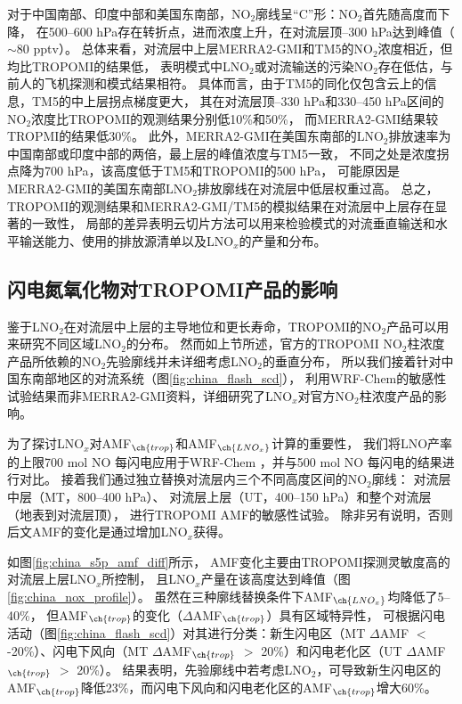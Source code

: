 对于中国南部、印度中部和美国东南部，NO$_2$廓线呈“C”形：NO$_2$首先随高度而下降，
在500--600 hPa存在转折点，进而浓度上升，在对流层顶--300 hPa达到峰值（$\sim$80 pptv）。
总体来看，对流层中上层MERRA2-GMI和TM5的NO$_2$浓度相近，但均比TROPOMI的结果低，
表明模式中LNO$_2$或对流输送的污染NO$_2$存在低估，与前人的飞机探测和模式结果相符\citep{Laughner.2019a}。
具体而言，由于TM5的同化仅包含云上的信息，TM5的中上层拐点梯度更大，
其在对流层顶--330 hPa和330--450 hPa区间的NO$_2$浓度比TROPOMI的观测结果分别低10\%和50\%，
而MERRA2-GMI结果较TROPMI的结果低30\%。
此外，MERRA2-GMI在美国东南部的LNO$_2$排放速率为中国南部或印度中部的两倍，最上层的峰值浓度与TM5一致，
不同之处是浓度拐点降为700 hPa，该高度低于TM5和TROPOMI的500 hPa，
可能原因是MERRA2-GMI的美国东南部LNO$_2$排放廓线在对流层中低层权重过高。
总之，TROPOMI的观测结果和MERRA2-GMI/TM5的模拟结果在对流层中上层存在显著的一致性，
局部的差异表明云切片方法可以用来检验模式的对流垂直输送和水平输送能力、使用的排放源清单以及LNO$_x$的产量和分布。


\subsection{闪电氮氧化物对TROPOMI产品的影响}  \label{sec:lnox_affects_tropomi}

鉴于LNO$_2$在对流层中上层的主导地位和更长寿命，TROPOMI的NO$_2$产品可以用来研究不同区域LNO$_2$的分布。
然而如上节所述，官方的TROPOMI NO$_2$柱浓度产品所依赖的NO$_2$先验廓线并未详细考虑LNO$_2$的垂直分布，
所以我们接着针对中国东南部地区的对流系统（图\ref{fig:china_flash_scd}），
利用WRF-Chem的敏感性试验结果而非MERRA2-GMI资料，详细研究了LNO$_x$对官方NO$_2$柱浓度产品的影响。

为了探讨LNO$_x$对AMF$_{\ch{trop}}$和AMF$_{\ch{LNO_x}}$计算的重要性，
我们将LNO产率的上限700 mol NO 每闪电\citep{Ott.2010}应用于WRF-Chem ，并与500 mol NO 每闪电的结果进行对比。
接着我们通过独立替换对流层内三个不同高度区间的NO$_2$廓线：
对流层中层（MT，800--400 hPa）、
对流层上层（UT，400--150 hPa）和整个对流层（地表到对流层顶），
进行TROPOMI AMF的敏感性试验。
除非另有说明，否则后文AMF的变化是通过增加LNO$_x$获得。

如图\ref{fig:china_s5p_amf_diff}所示，
AMF变化主要由TROPOMI探测灵敏度高的对流层上层LNO$_x$所控制\citep{Beirle.2009,Laughner.2017}，
且LNO$_x$产量在该高度达到峰值（图\ref{fig:china_nox_profile}）。
虽然在三种廓线替换条件下AMF$_{\ch{LNO_x}}$均降低了5--40\%，
但AMF$_{\ch{trop}}$的变化（$\Delta$AMF$_{\ch{trop}}$）具有区域特异性，
可根据闪电活动（图\ref{fig:china_flash_scd}）对其进行分类：新生闪电区（MT $\Delta$AMF $<$ -20\%）、闪电下风向（MT $\Delta$AMF$_{\ch{trop}}$ $>$ 20\%）和闪电老化区（UT $\Delta$AMF$_{\ch{trop}}$ $>$ 20\%）。
结果表明，先验廓线中若考虑LNO$_2$，可导致新生闪电区的AMF$_{\ch{trop}}$降低23\%，而闪电下风向和闪电老化区的AMF$_{\ch{trop}}$增大60\%。

